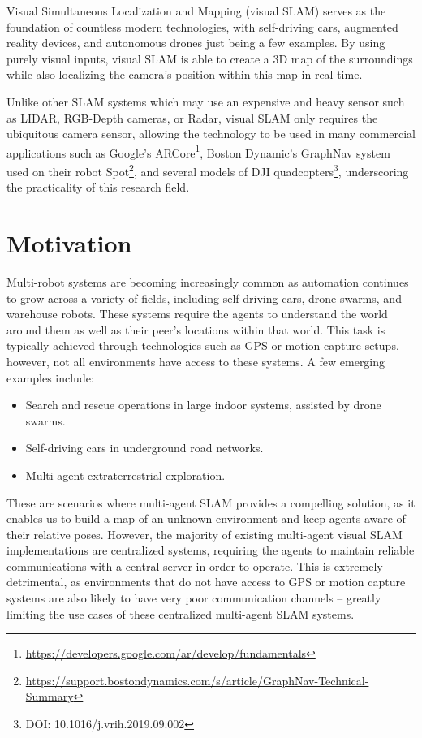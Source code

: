 
\label{sec:introduction}
Visual Simultaneous Localization and Mapping (visual SLAM) serves as the foundation of countless modern technologies, with self-driving cars, augmented reality devices, and autonomous drones just being a few examples. By using purely visual inputs, visual SLAM is able to create a 3D map of the surroundings while also localizing the camera's position within this map in real-time.

Unlike other SLAM systems which may use an expensive and heavy sensor such as LIDAR, RGB-Depth cameras, or Radar, visual SLAM only requires the ubiquitous camera sensor, allowing the technology to be used in many commercial applications such as Google's ARCore\footnote[1]{\url{https://developers.google.com/ar/develop/fundamentals}}, Boston Dynamic's GraphNav system used on their robot Spot\footnote[2]{\url{https://support.bostondynamics.com/s/article/GraphNav-Technical-Summary}}, and several models of DJI quadcopters\footnote[3]{DOI: 10.1016/j.vrih.2019.09.002}, underscoring the practicality of this research field.

\section{Motivation}
\label{sec:motivation}
Multi-robot systems are becoming increasingly common as automation continues to grow across a variety of fields, including self-driving cars, drone swarms, and warehouse robots. These systems require the agents to understand the world around them as well as their peer's locations within that world. This task is typically achieved through technologies such as GPS or motion capture setups, however, not all environments have access to these systems. A few emerging examples include: \noparskip
\smallbreak

{
    \begin{itemize}[nosep]
        \item Search and rescue operations in large indoor systems, assisted by drone swarms.
        \item Self-driving cars in underground road networks.
        \item Multi-agent extraterrestrial exploration.
    \end{itemize}
}

These are scenarios where multi-agent SLAM provides a compelling solution, as it enables us to build a map of an unknown environment and keep agents aware of their relative poses. However, the majority of existing multi-agent visual SLAM implementations are centralized systems, requiring the agents to maintain reliable communications with a central server in order to operate. This is extremely detrimental, as environments that do not have access to GPS or motion capture systems are also likely to have very poor communication channels – greatly limiting the use cases of these centralized multi-agent SLAM systems.


